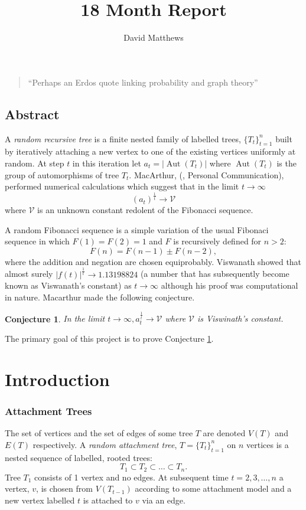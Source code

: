 \documentclass[oneside]{book} %
\title{18 Month Report}
\author{David Matthews}
\newtheorem{con}[thm]{Conjecture}
\theoremstyle{definition}
\numberwithin{equation}{section}
\DeclareMathOperator{\Aut}{Aut} %
\begin{document}
\begin{quotation}
 ``Perhaps an Erdos quote linking probability and graph theory'' 
\end{quotation}
   
\section{Abstract}\label{sec:intro}
A \emph{random recursive tree} is a finite nested family of labelled trees, $\{T_t\}_{t=1}^{n}$ built by iteratively attaching
a new vertex to one of the existing vertices uniformly at random. At step $t$ in this iteration let
$a_t = \lvert \Aut(T_t) \rvert$ where $\Aut(T_t)$ is the group of automorphisms of tree $T_t$.  MacArthur, (\cite{Bens}, Personal Communication), performed numerical calculations which suggest that in the limit $t \rightarrow \infty$
\[(a_t)^\frac{1}{t} \rightarrow \mathcal{V} \]
where $\mathcal{V}$ is an unknown constant redolent of the Fibonacci sequence.

A random Fibonacci sequence is a simple variation of the usual Fibonaci sequence in which $F(1) = F(2) = 1$ and $F$ is recursively defined for $n>2$:
\[F(n) = F(n-1) \pm F(n-2), \]
where the addition and negation are chosen equiprobably.  Viswanath \cite{Viswanath} showed that almost surely 
$|f(t)|^{\frac{1}{t}} \rightarrow 1.13198824 $ (a number that has subsequently become known as Viswanath's constant) as 
$t\rightarrow\infty$ although his proof was computational in nature.   Macarthur made the following conjecture.

\begin{con}\label{conj:1}
In the limit $t \rightarrow \infty, a_t^\frac{1}{t} \rightarrow \mathcal{V} $ where $\mathcal{V}$ is Viswinath's constant.  
\end{con}

The primary goal of this project is to prove Conjecture \ref{conj:1}.
   
\chapter{Introduction}\label{sec:background}
\subsection{Attachment Trees}\label{sec:att}
The set of vertices and the set of edges of some tree $T$ are denoted $V(T)$ and $E(T)$ respectively.  
A \emph{random attachment tree}, $T = \{T_t\}_{t=1}^n$ on $n$ vertices is a nested sequence of  labelled, rooted trees:
\[T_{1} \subset T_{2} \subset \dots \subset T_{n}.\]
Tree $T_{1}$ consists of 1 vertex and no edges. At subsequent time $t = 2,3,\dots,n$ a vertex, $v$, is chosen from 
$V(T_{t-1})$ according to some attachment model and a new vertex labelled $t$ is attached to $v$ via an edge. 
\end{document}
